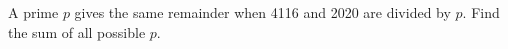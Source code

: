 A prime $p$ gives the same remainder when 4116 and 2020 are divided by $p$. Find the sum of all possible $p$.
